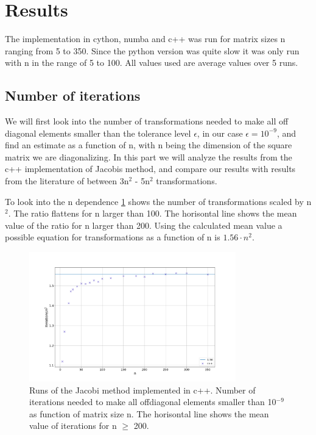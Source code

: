 \section*{Results}

The implementation in cython, numba and c++ was run for matrix sizes n ranging from 5
to 350. Since the python version was quite slow it was only run with n in the
range of 5 to 100. All values used are average values over 5 runs.


\subsection*{Number of iterations}

We will first look into the number of transformations needed to make all off
diagonal elements smaller than the tolerance level $\epsilon$, in our case
$\epsilon = 10^{-9}$, and find an estimate as a function of n, with n being the
dimension of the square matrix we are diagonalizing. In this part we will
analyze the results from the c++ implementation of Jacobis method, and compare
our results with results from the literature of between 3n$^2$ - 5n$^2$ \cite{lectures}
transformations.

To look into the n dependence \cref{fig:iterations_scaled} shows the number of
transformations scaled by n$^2$. The ratio flattens for n larger than 100. The
horisontal line shows the mean value of the ratio for n larger than 200. Using
the calculated mean value a possible equation for transformations as a function
of n is $1.56\cdot n^2$.

\begin{figure}[H]
  \centering
  \includegraphics[width=0.8\textwidth]{../figures/iterations_compare_n2.png}
  \caption{Runs of the Jacobi method implemented in c++. Number of iterations
  needed to make all offdiagonal elements smaller than 10$^{-9}$ as function of
  matrix size n. The horisontal line shows the mean value of iterations for
  n $\geq$ 200.}

  \label{fig:iterations_scaled}
\end{figure}


